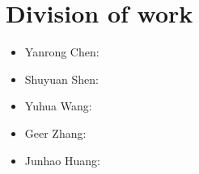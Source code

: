 \section{Division of work}
\begin{itemize}
    \item Yanrong Chen: 
    \item Shuyuan Shen: 
    \item Yuhua Wang:
    \item Geer Zhang:
    \item Junhao Huang:
\end{itemize}
